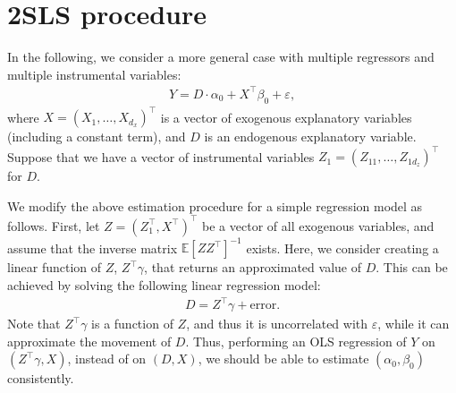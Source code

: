 \documentclass[10.5pt, A4paper, openany, uplatex]{book}
\newcommand{\eps}{\varepsilon}
\newcommand{\E}{\mathbb{E}}
\numberwithin{equation}{section}
\begin{document}
\section{2SLS procedure}

In the following, we consider a more general case with multiple regressors and multiple instrumental variables:
\begin{align*}
	Y = D \cdot \alpha_0 + X^\top \beta_0 + \eps,
\end{align*}
where $X = (X_1, \ldots , X_{d_x})^\top$ is a vector of exogenous explanatory variables (including a constant term), and $D$ is an endogenous explanatory variable.
Suppose that we have a vector of instrumental variables $Z_1 = (Z_{11}, \ldots, Z_{1d_z})^\top$ for $D$.

We modify the above estimation procedure for a simple regression model as follows.
First, let $Z = (Z_1^\top, X^\top)^\top$ be a vector of all exogenous variables, and assume that the inverse matrix $\E[Z Z^\top]^{-1}$ exists.
Here, we consider creating a linear function of $Z$, $Z^\top\gamma$, that returns an approximated value of $D$.
This can be achieved by solving the following linear regression model:
\begin{align*}
D = Z^\top \gamma + \text{error}.
\end{align*}
Note that $Z^\top\gamma$ is a function of $Z$, and thus it is uncorrelated with $\eps$, while it can approximate the movement of $D$.
Thus, performing an OLS regression of $Y$ on $(Z^\top\gamma, X)$, instead of on $(D, X)$, we should be able to estimate $(\alpha_0, \beta_0)$ consistently.
\end{document}
